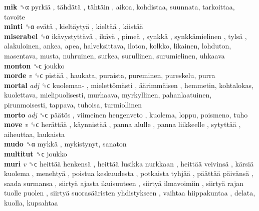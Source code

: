 \textbf{mik} ␝α   pyrkiä ,  tähdätä ,  tähtäin , aikoa, kohdistaa, suunnata, tarkoittaa, tavoite  \\
\textbf{minti} ␝α   evätä ,  kieltäytyä ,  kieltää ,  kiistää   \\
\textbf{miserabel} ␝α   ikävystyttävä ,  ikävä ,  pimeä ,  synkkä ,  synkkämielinen ,  tylsä , alakuloinen, ankea, apea, halveksittava, iloton, kolkko, likainen, lohduton, masentava, musta, nuhruinen, surkea, surullinen, surumielinen, uhkaava  \\
\textbf{monton} ␝ϲ  joukko  \\
\textbf{morde} \emph{v}  ␝ϲ   pistää , haukata, puraista, pureminen, pureskelu, purra  \\
\textbf{mortal} \emph{adj}  ␝ϲ   kuoleman- ,  mielettömästi ,  äärimmäisen , hemmetin, kohtalokas, kuolettava, mielipuolisesti, murhaava, myrkyllinen, pahanlaatuinen, pirunmoisesti, tappava, tuhoisa, turmiollinen  \\
\textbf{morto} \emph{adj}  ␝ϲ   päätös ,  viimeinen hengenveto , kuolema, loppu, poismeno, tuho  \\
\textbf{move} \emph{v}  ␝ϲ   herättää ,  käynnistää ,  panna alulle ,  panna liikkeelle ,  sytyttää , aiheuttaa, laukaista  \\
\textbf{mudo} ␝α   mykkä , mykistynyt, sanaton  \\
\textbf{multitut} ␝ϲ  joukko  \\
\textbf{muri} \emph{v}  ␝ϲ   heittää henkensä ,  heittää lusikka nurkkaan ,  heittää veivinsä ,  kärsiä kuolema ,  menehtyä ,  poistua keskuudesta ,  potkaista tyhjää ,  päättää päivänsä ,  saada surmansa ,  siirtyä ajasta ikuisuuteen ,  siirtyä ilmavoimiin ,  siirtyä rajan tuolle puolen ,  siirtyä suorasääristen yhdistykseen ,  vaihtaa hiippakuntaa , delata, kuolla, kupsahtaa  \\
